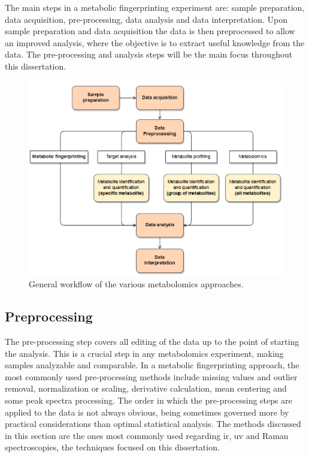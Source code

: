 The main steps in a metabolic fingerprinting experiment are: sample preparation, data acquisition, pre-processing, data analysis and data interpretation. Upon sample preparation and data acquisition the data is then preprocessed to allow an improved analysis, where the objective is to extract useful knowledge from the data. The pre-processing and analysis steps will be the main focus throughout this dissertation.

\begin{figure}[!ht]
	\centering
	\includegraphics[width=0.9\linewidth]{Imagens/workflow}
	\caption{General workflow of the various metabolomics approaches.}
	\label{workflow}
\end{figure}


\subsection{Preprocessing}

The pre-processing step covers all editing of the data up to the point of starting the analysis. This is a crucial step in any metabolomics experiment, making samples analyzable and comparable. In a metabolic fingerprinting approach, the most commonly used pre-processing methods include missing values and outlier removal, normalization or scaling, derivative calculation, mean centering and some peak spectra processing. The order in which the pre-processing steps are applied to the data is not always obvious, being sometimes governed more by practical considerations than optimal statistical analysis. The methods discussed in this section are the ones most commonly used regarding \gls{ir}, \gls{uv} and Raman spectroscopies, the techniques focused on this dissertation.

